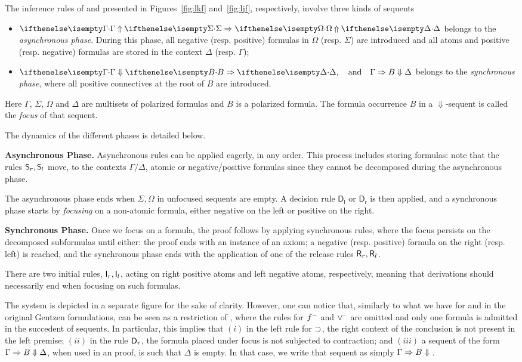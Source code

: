 The inference rules of \LKF and \LJF presented in Figures~\ref{fig:lkf} and~\ref{fig:ljf}, respectively, involve three kinds of sequents 
\begin{itemize}
\item $\jUnf{\Gamma}{\Sigma}{\Omega}{\Delta}$ belongs to the {\em asynchronous phase}. During this phase, all negative (resp. positive) formulas in  $\Omega$ (resp. $\Sigma$) are introduced and all atoms and positive (resp. negative) formulas  are stored in the context $\Delta$ (resp. $\Gamma$);
\item $\jLf{\Gamma}{B}{\Delta},\quad\hbox{and}\quad
  \jRf{\Gamma}{B}{\Delta}$ belongs to the {\em synchronous phase}, where all positive connectives at the root of $B$ are introduced. 
\end{itemize}
Here $\Gamma$, $\Sigma$, $\Omega$ and $\Delta$ are
multisets of polarized formulas and $B$ is a polarized formula.
%
The formula occurrence $B$ in a $\Downarrow$-sequent is called the
\emph{focus} of that sequent.

The dynamics of the different phases is detailed below.

\noindent
{\bf Asynchronous Phase.} Asynchronous rules can be applied eagerly, in any order.
This process includes storing formulas: note that the rules $\mathsf{S}_r, \mathsf{S}_l$ move, to the 
contexts $\Gamma/\Delta$, atomic or negative/positive formulas since they cannot be decomposed during the asynchronous phase.

The asynchronous phase ends when $\Sigma,\Omega$ in unfocused sequents are empty. A decision rule $\mathsf{D_l}$ or  $\mathsf{D_r}$ is then applied,  and
a synchronous phase starts by {\em focusing} on a non-atomic formula, either negative on the left or positive on the right.

\noindent
{\bf Synchronous Phase.} Once we focus on a formula, the proof  follows by applying synchronous rules, where  the focus persists on the decomposed subformulas until either: the proof ends with an instance of an axiom;
a negative (resp. positive) formula  on the right (resp. left) is reached, and the synchronous phase  ends with the application of one of the release rules $\mathsf{R}_r,\mathsf{R}_l$.


There are two initial rules, $\mathsf{I}_r,\mathsf{I}_l$, acting on right positive atoms and left negative atoms, respectively, meaning that derivations should necessarily end when focusing on such formulas.


The system  \LJF is depicted in a separate figure for the sake of clarity.
%
However, one can notice that, similarly to what we have for \LJ and
\LK in the original Gentzen formulations, \LJF can be seen as a
restriction of \LKF, where the rules for $f^-$ and $\vee^{\!-}$ are
omitted and only one formula is admitted in the succedent of sequents.  In
particular, this implies that $(i)$ in the left rule for $\supset$, the
right context of the conclusion is not present in the left premise;
$(ii)$ in the rule $\mathsf{D}_r$, the formula placed under focus is
not subjected to contraction; and $(iii)$ a sequent of the form $\Gamma \Rightarrow B \Downarrow{\Delta}$, when used in an
\LJF proof, is such that $\Delta$ is empty.
%
In that case, we write that sequent as simply $\Gamma \Rightarrow B \Downarrow{}$.